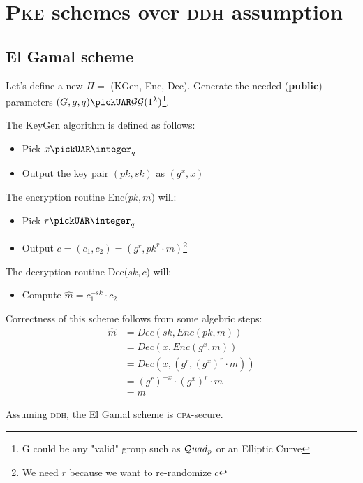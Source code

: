 \section{\textsc{Pke} schemes over \textsc{ddh} assumption}
\subsection{El Gamal scheme}
Let's define a new $\Pi=$ (KGen, Enc, Dec). Generate the needed (\textbf{public}) parameters $(G,g,q)\pickUAR \groupgen(1^{\lambda})$\footnote{G could be any "valid" group such as $\mathcal{Q}uad_p$ or an Elliptic Curve}.

The KeyGen algorithm is defined as follows:
\begin{itemize}
    \item Pick $x \pickUAR \integer_q$
    \item Output the key pair $(pk, sk)$ as $(g^x, x)$
\end{itemize}
The encryption routine Enc($pk, m$) will:
\begin{itemize}
    \item Pick $r\pickUAR \integer_q$
    \item Output $c=(c_1, c_2)=(g^r, pk^r \cdot m)$\footnote{We need $r$ because we want to re-randomize $c$}
\end{itemize}
The decryption routine Dec($sk, c$) will:
\begin{itemize}
    \item Compute $\hat{m} = c_1^{-sk} \cdot c_2$
\end{itemize}
Correctness of this scheme follows from some algebric steps:
\begin{align*}
    \hat{m} &= Dec(sk, Enc(pk, m)) \\
    &= Dec(x, Enc(g^x, m)) \\
    &= Dec(x, (g^r, (g^x)^r \cdot m)) \\
    &= (g^r)^{-x} \cdot (g^x)^r \cdot m \\
    &= m
\end{align*}

\begin{theorem}
    Assuming \textsc{ddh}, the El Gamal scheme is \textsc{cpa}-secure.
\end{theorem}

